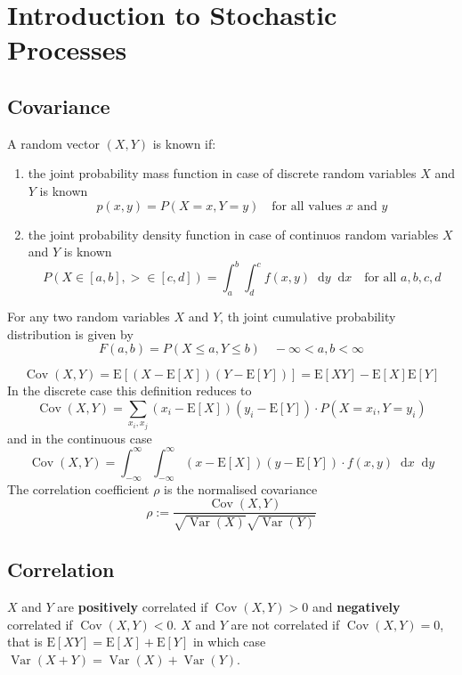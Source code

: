 \documentclass[11pt]{article}
\theoremstyle{definition}
\newcommand*\ev[1]{\mathrel{\text{E}\left[#1\right]}}
\newcommand*\diff{\mathop{}\!\mathrm{d}}
\newcommand*\Cov[1]{\mathop{\text{Cov}}\left(#1\right)}
\newcommand*\Var[1]{\mathop{\text{Var}}\left(#1\right)}
\begin{document}
\section{Introduction to Stochastic Processes}
\subsection{Covariance}
A random vector $(X,Y)$ is known if:
\begin{enumerate}[label=(\alph*)]
	\item the joint probability mass function in case of discrete random variables $X$ and $Y$ is known
	\begin{equation*}
		p(x,y) = P(X=x,Y=y)\quad \text{for all values $x$ and $y$}
	\end{equation*}
	\item the joint probability density function in case of continuos random variables $X$ and $Y$ is known
	\begin{equation*}
		P(X\in [a,b], >\in [c,d]) = \int_{a}^{b}\int_{d}^{c} f(x,y)\diff y\diff x\quad \text{for all } a,b,c,d
	\end{equation*}
\end{enumerate}
For any two random variables $X$ and $Y$, th joint cumulative probability distribution is given by
\begin{equation*}
	F(a,b) = P(X\leq a, Y\leq b)\quad -\infty < a, b<\infty
\end{equation*}

\begin{equation*}
	\Cov{X,Y} = \ev{(X-\ev{X})(Y-\ev{Y})} = \ev{XY} - \ev{X}\ev{Y}
\end{equation*}
In the discrete case this definition reduces to
\begin{equation*}
	\Cov{X,Y} = \sum_{x_i,x_j} (x_i - \ev{X})(y_i - \ev{Y})\cdot P(X=x_i,Y=y_i)
\end{equation*}
and in the continuous case
\begin{equation*}
	\Cov{X,Y} = \int_{-\infty}^{\infty}\int_{-\infty}^{\infty}(x-\ev{X})(y-\ev{Y})\cdot f(x,y)\diff x\diff y
\end{equation*}
The correlation coefficient $\rho$ is the normalised covariance
\begin{equation*}
	\rho := \frac{\Cov{X,Y}}{\sqrt{\Var{X}}\sqrt{\Var{Y}}}
\end{equation*}

\subsection{Correlation}
$X$ and $Y$ are \textbf{positively} correlated if $\Cov{X,Y} > 0$ and \textbf{negatively} correlated if $\Cov{X,Y} < 0$. $X$ and $Y$ are not correlated if $\Cov{X,Y} = 0$, that is $\ev{XY} = \ev{X} + \ev{Y}$ in which case $\Var{X + Y} = \Var{X} + \Var{Y}$.
\end{document}
